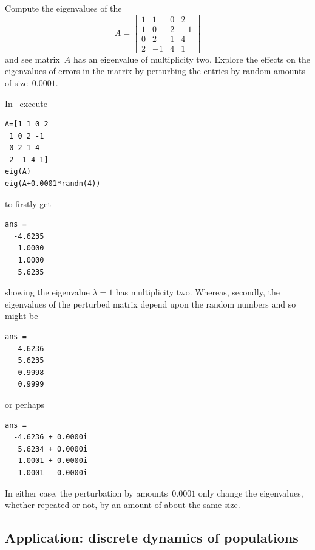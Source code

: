 \begin{example} \label{eg:}
Compute the eigenvalues of the 
\begin{equation*}
A=\begin{bmatrix}1&1&0&2
\\1&0&2&-1
\\0&2&1&4
\\2&-1&4&1\end{bmatrix}
\end{equation*}
and see matrix~\(A\) has an eigenvalue of multiplicity two.  
Explore the effects on the eigenvalues of errors in the matrix by perturbing the entries by random amounts of size~\(0.0001\).
\begin{solution} 
In \script\ execute
\begin{verbatim}
A=[1 1 0 2
 1 0 2 -1
 0 2 1 4
 2 -1 4 1]
eig(A)
eig(A+0.0001*randn(4))
\end{verbatim}
\setbox\ajrqrbox\hbox{}%
\marginpar{\usebox{\ajrqrbox}}%
to firstly get
\begin{verbatim}
ans =
  -4.6235
   1.0000
   1.0000
   5.6235
\end{verbatim}
showing the eigenvalue \(\lambda=1\) has multiplicity two.
Whereas, secondly, the eigenvalues of the perturbed matrix depend upon the random numbers and so might be
\begin{verbatim}
ans =
  -4.6236
   5.6235
   0.9998
   0.9999
\end{verbatim}
or perhaps
\begin{verbatim}
ans =
  -4.6236 + 0.0000i
   5.6234 + 0.0000i
   1.0001 + 0.0000i
   1.0001 - 0.0000i
\end{verbatim}
In either case, the perturbation by amounts~\(0.0001\) only change the eigenvalues, whether repeated or not, by an amount of about the same size.
\end{solution}
\end{example}











\subsection{Application: discrete dynamics of populations}
\label{sec:ddp}

